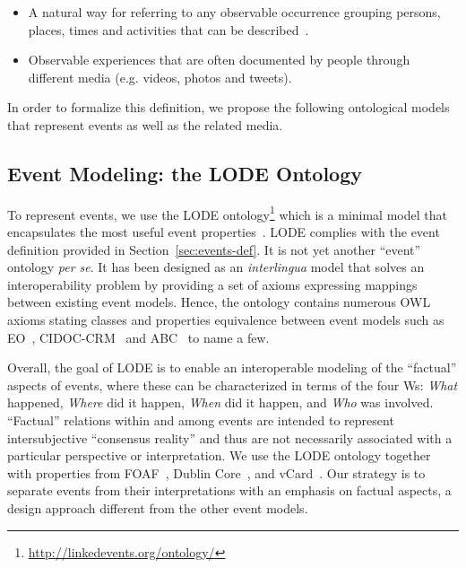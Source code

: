 \begin{itemize}
\item A natural way for referring to any observable occurrence grouping persons, places, times and activities that can be described~\cite{Shaw:ASWC09}.
\item Observable experiences that are often documented by people through different media (e.g. videos, photos and tweets).
\end{itemize}

In order to formalize this definition, we propose the following ontological models that represent events as well as the related media.

\subsection{Event Modeling: the LODE Ontology}
To represent events, we use the LODE ontology\footnote{\url{http://linkedevents.org/ontology/}} which is a minimal model that encapsulates the most useful event properties~\cite{Shaw:ASWC09}. LODE complies with the event definition provided in Section~\ref{sec:events-def}. It is not yet another ``event'' ontology \emph{per se}. It has been designed as an \emph{interlingua} model that solves an interoperability problem by providing a set of axioms expressing mappings between existing event models. Hence, the ontology contains numerous OWL axioms stating classes and properties equivalence between event models such as EO~\cite{Raimond:ISMIR07}, CIDOC-CRM~\cite{Doerr:03} and ABC~\cite{Lagoze:DCMI01} to name a few. 

Overall, the goal of LODE is to enable an interoperable modeling of the ``factual'' aspects of events, where these can be characterized in terms of the four Ws: \emph{What} happened, \emph{Where} did it happen, \emph{When} did it happen, and \emph{Who} was involved. ``Factual'' relations within and among events are intended to represent intersubjective ``consensus reality'' and thus are not necessarily associated with a particular perspective or interpretation. We use the LODE ontology together with properties from FOAF~\cite{Foaf:2014}, Dublin Core~\cite{DublinCore:2012}, and vCard~\cite{vCard:2013}. Our strategy is to separate events from their interpretations with an emphasis on factual aspects, a design approach different from the other event models. 

